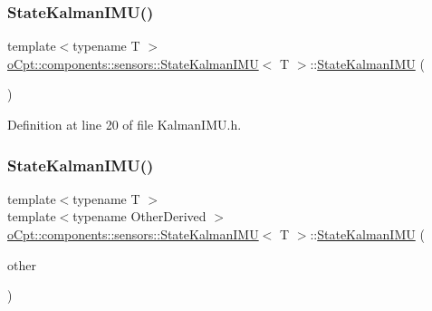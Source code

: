 \subsubsection{\texorpdfstring{State\+Kalman\+I\+M\+U()}{StateKalmanIMU()}\hspace{0.1cm}{\footnotesize\ttfamily [1/2]}}
{\footnotesize\ttfamily template$<$typename T $>$ \\
\hyperlink{classo_cpt_1_1components_1_1sensors_1_1_state_kalman_i_m_u}{o\+Cpt\+::components\+::sensors\+::\+State\+Kalman\+I\+MU}$<$ T $>$\+::\hyperlink{classo_cpt_1_1components_1_1sensors_1_1_state_kalman_i_m_u}{State\+Kalman\+I\+MU} (\begin{DoxyParamCaption}\item[{void}]{ }\end{DoxyParamCaption})\hspace{0.3cm}{\ttfamily [inline]}}



Definition at line 20 of file Kalman\+I\+M\+U.\+h.

\hypertarget{classo_cpt_1_1components_1_1sensors_1_1_state_kalman_i_m_u_a4ca7aad5fc5d4eb14f5bf07579392fe3}{}\label{classo_cpt_1_1components_1_1sensors_1_1_state_kalman_i_m_u_a4ca7aad5fc5d4eb14f5bf07579392fe3} 
\subsubsection{\texorpdfstring{State\+Kalman\+I\+M\+U()}{StateKalmanIMU()}\hspace{0.1cm}{\footnotesize\ttfamily [2/2]}}
{\footnotesize\ttfamily template$<$typename T $>$ \\
template$<$typename Other\+Derived $>$ \\
\hyperlink{classo_cpt_1_1components_1_1sensors_1_1_state_kalman_i_m_u}{o\+Cpt\+::components\+::sensors\+::\+State\+Kalman\+I\+MU}$<$ T $>$\+::\hyperlink{classo_cpt_1_1components_1_1sensors_1_1_state_kalman_i_m_u}{State\+Kalman\+I\+MU} (\begin{DoxyParamCaption}\item[{const Eigen\+::\+Matrix\+Base$<$ Other\+Derived $>$ \&}]{other }\end{DoxyParamCaption})\hspace{0.3cm}{\ttfamily [inline]}}



